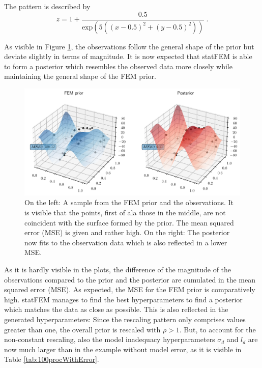 \documentclass[%
  a4paper,oneside,%
  11pt,%
  smallchapters,
  style=printdev,
  extramargin,
  green,%
  rgb, <cmyk>
  ]{tubsbook}
\begin{document}
The pattern is described by
\begin{equation}
z = 1+\frac{0.5}{\mathrm{exp}(5((x-0.5)^2 + (y-0.5)^2))} \;.
\end{equation}

As visible in Figure \ref{fig:ObservationPriorPost}, the observations follow the general shape of the prior but deviate slightly in terms of magnitude. It is now expected that statFEM is able to form a posterior which resembles the observed data more closely while maintaining the general shape of the FEM prior.
\begin{figure}[!ht]
\includegraphics[width=1\textwidth]{pics/3dTest.pdf}
\centering
\caption[Comparison of prior and posterior in a 3D view for the observations with model error]{On the left: A sample from the FEM prior and the observations. It is visible that the points, first of ala those in the middle, are not coincident with the surface formed by the prior. The mean squared error (MSE) is given and rather high. On the right: The posterior now fits to the observation data which is also reflected in a lower MSE.}
\label{fig:ObservationPriorPost}
\end{figure}
As it is hardly visible in the plots, the difference of the magnitude of the observations compared to the prior and the posterior are cumulated in the mean squared error (MSE). As expected, the MSE for the FEM prior is comparatively high. statFEM manages to find the best hyperparameters to find a posterior which matches the data as close as possible. 
This is also reflected in the generated hyperparameters: Since the rescaling pattern only comprises values greater than one, the overall prior is rescaled with $\rho > 1$. But, to account for the non-constant rescaling, also the model inadequacy hyperparameters $\sigma_d$ and $l_d$ are now much larger than in the example without model error, as it is visible in Table \ref{tab:100procWithError}.
\end{document}
